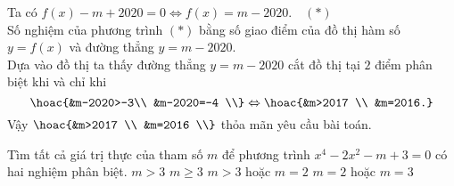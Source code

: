 \begin{ex}
{\begin{center}
        \end{center}
        Ta có $f(x)-m+2020=0\Leftrightarrow f(x) =m-2020. \quad(*)$\\
        Số nghiệm của phương trình $(*)$ bằng số giao điểm của đồ thị hàm số $ y=f(x) $ và đường thẳng $ y=m-2020$.\\ Dựa vào đồ thị ta thấy đường thẳng $ y=m-2020$ cắt đồ thị tại $2$ điểm phân biệt khi và chỉ khi $$\hoac{&m-2020>-3\\ &m-2020=-4 \\} \Leftrightarrow \hoac{&m>2017 \\ &m=2016.}$$
        Vậy $\hoac{&m>2017 \\ &m=2016 \\}$ thỏa mãn yêu cầu bài toán.
    }
\end{ex}
\begin{ex}%
    Tìm tất cả giá trị thực của tham số $m$ để phương trình $x^4-2x^2-m+3=0$ có hai nghiệm phân biệt.
    \choice
    {$m>3$}
    {$m\ge 3$}
    {\True $m>3$ hoặc $m=2$}
    {$m=2$ hoặc $m=3$}
\end{ex}
